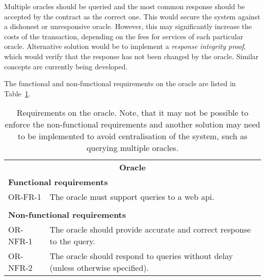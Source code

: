 Multiple oracles should be queried and the most common response should be accepted by the contract as the correct one. This would secure the system against a dishonest or unresponsive oracle. However, this may significantly increase the costs of the transaction, depending on the fees for services of each particular oracle. Alternative solution would be to implement a \textit{response integrity proof}, which would verify that the response has not been changed by the oracle. Similar concepts are currently being developed\footnotemark.
% 

The functional and non-functional requirements on the oracle are listed in Table~\ref{tab:reqs-oracle}.

\begin{table}[ht]
    \centering
    \begin{tabularx}{\textwidth}{|l X|}
    \hline
        \multicolumn{2}{|c|}{\textbf{Oracle}}\\
        \multicolumn{2}{|l|}{\textbf{Functional requirements}}\\
        OR-FR-1&The oracle must support queries to a web \acrshort{api}.\\
        &\\
        \multicolumn{2}{|l|}{\textbf{Non-functional requirements}}\\
        OR-NFR-1&The oracle should provide accurate and correct response to the query.\\
        OR-NFR-2&The oracle should respond to queries without delay (unless otherwise specified).\\
    \hline
    \end{tabularx}
    \caption{Requirements on the oracle. Note, that it may not be possible to enforce the non-functional requirements and another solution may need to be implemented to avoid centralisation of the system, such as querying multiple oracles.}
    \label{tab:reqs-oracle}
\end{table}

